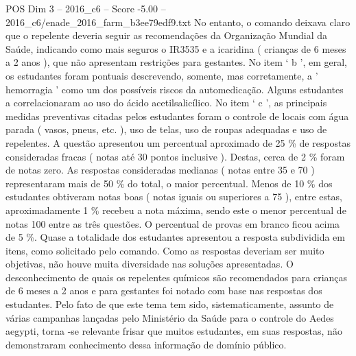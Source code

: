 \begin{textsample}{POS Dim 3 – 2016\_c6 – Score -5.00 – 2016\_c6/enade\_2016\_farm\_b3ee79edf9.txt}
No entanto, o comando deixava claro que o repelente deveria seguir as recomendações da Organização Mundial da Saúde, indicando como mais seguros o IR3535 e a icaridina ( crianças de 6 meses a 2 anos ), que não apresentam restrições para gestantes.
No item ‘ b ’, em geral, os estudantes foram pontuais descrevendo, somente, mas corretamente, a ' hemorragia ' como um dos possíveis riscos da automedicação.
Alguns estudantes a correlacionaram ao uso do ácido acetilsalicílico.
No item ‘ c ’, as principais medidas preventivas citadas pelos estudantes foram o controle de locais com água parada ( vasos, pneus, etc. ), uso de telas, uso de roupas adequadas e uso de repelentes.
A questão apresentou um percentual aproximado de 25 \% de respostas consideradas fracas ( notas até 30 pontos inclusive ).
Destas, cerca de 2 \% foram de notas zero.
As respostas consideradas medianas ( notas entre 35 e 70 ) representaram mais de 50 \% do total, o maior percentual.
Menos de 10 \% dos estudantes obtiveram notas boas ( notas iguais ou superiores a 75 ), entre estas, aproximadamente 1 \% recebeu a nota máxima, sendo este o menor percentual de notas 100 entre as três questões.
O percentual de provas em branco ficou acima de 5 \%.
Quase a totalidade dos estudantes apresentou a resposta subdividida em itens, como solicitado pelo comando.
Como as respostas deveriam ser muito objetivas, não houve muita diversidade nas soluções apresentadas.
O desconhecimento de quais os repelentes químicos são recomendados para crianças de 6 meses a 2 anos e para gestantes foi notado com base nas respostas dos estudantes.
Pelo fato de que este tema tem sido, sistematicamente, assunto de várias campanhas lançadas pelo Ministério da Saúde para o controle do Aedes aegypti, torna -se relevante frisar que muitos estudantes, em suas respostas, não demonstraram conhecimento dessa informação de domínio público.

\end{textsample}

